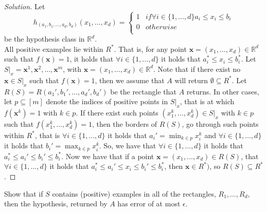 \documentclass[10pt, a4paper, twoside]{amsart}
\newcommand{\R}{\ensuremath{\mathbb{R}}}
\newenvironment{solution}
               {\let\oldqedsymbol=\qedsymbol
                \renewcommand{\qedsymbol}{$\blacktriangleleft$}
                \begin{proof}[Solution]}
               {\end{proof}
                \renewcommand{\qedsymbol}{\oldqedsymbol}}
\begin{document}
\begin{solution}
Let
\begin{equation*}
  h_{(a_1,b_1,\ldots,a_d,b_d)}(x_1,\ldots,x_d) = 
 \begin{cases}
  1 & if \forall i \in \{1,\ldots,d \} a_i \leq x_i \leq b_i \\
  0 & otherwise\\
\end{cases}
\end{equation*}
be the hypothesis class in $\R^d$.\\
All positive examples lie within $R^*$. That is, for any point $\mathbf{x} = (x_1,\ldots,x_d) \in \R^d$ such that $f(\mathbf{x})=1$, it holds that $\forall i \in \{1,\ldots,d\}$ it holds that $ a_i^*\leq x_i \leq b_i^*$. Let $S|_x = {\mathbf{x}^1, \mathbf{x}^2,\ldots, \mathbf{x}^m}$, with $\mathbf{x} = (x_1,\ldots,x_d) \in \R^d$. Note that if there exist no $\mathbf{x} \in S|_x$ such that $f(\mathbf{x})=1$, then we assume that $A$ will return $\emptyset \subseteq R^*$. Let $R(S)=R(a_1',b_1',\ldots,a_d',b_d')$ be the rectangle that $A$ returns. In other cases, let $p \subseteq [m]$ denote the indices of positive points in $S|_x$, that is at which $f(\mathbf{x}^k)=1$ with $k \in p$. If there exist such points $(x^k_1,\ldots,x^k_d)\in S|_x$  with $k \in p$ such that $f(x^k_1,\ldots,x^k_d)=1$, then the borders of $R(S)$, go through such points within $R^*$, that is $\forall i \in \{1,\ldots,d\}$ it holds that $ a_i' = \min_{k\in p} x^k_i$ and $\forall i \in \{1,\ldots,d\}$ it holds that $b_i' = \max_{k\in p} x^k_i$. So, we have that $\forall i \in \{1,\ldots,d\}$ it holds that $a_i^*\leq a_i'\leq b_i' \leq b_i^*$. Now we have that if a point $\mathbf{x} = (x_1,\ldots ,x_d)\in R(S)$, that $\forall i \in \{1,\ldots,d\}$ it holds that $a_i^*\leq a_i'\leq x_i \leq b_i' \leq b_i^*$, then $\mathbf{x} \in R^*)$, so $R(S) \subseteq R^*$.
\end{solution}
Show that if $S$ contains (positive) examples in all of the rectangles, $R_1,\ldots , R_d$, then the hypothesis, returned by $A$ has error of at most $\epsilon$. \\
\end{document}
